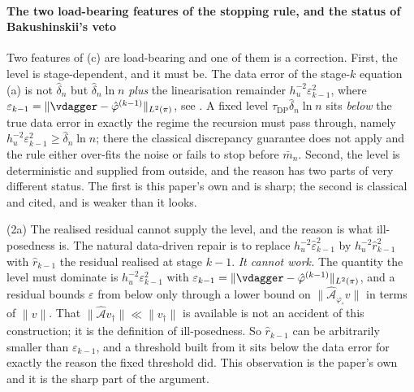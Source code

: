 \paragraph{The two load-bearing features of the stopping rule, and the status of Bakushinskii's veto}

Two features of (c) are load-bearing and one of them is a correction. First, the level is
stage-dependent, and it must be. The data error of the stage-$k$ equation (a) is not $\hat\delta_n$
but $\hat\delta_n\ln n$ \emph{plus} the linearisation remainder $h_u^{-2}\varepsilon_{k-1}^{2}$, where
$\varepsilon_{k-1}=\|\vdagger-\hat\varphi^{(k-1)}\|_{L^{2}(\pi)}$, see . A
fixed level $\tau_{\mathrm{DP}}\hat\delta_n\ln n$ sits
\emph{below} the true data error in exactly the regime the recursion must pass through, namely
$h_u^{-2}\varepsilon_{k-1}^{2}\ge\hat\delta_n\ln n$; there the classical discrepancy guarantee does not
apply and the rule either over-fits the noise or fails to stop before $\bar m_n$.
Second, the level is deterministic and supplied from outside, and the reason has two parts of
very different status. The first is this paper's own and is sharp; the second is classical and cited,
and is weaker than it looks.

(2a) The realised residual cannot supply the level, and the reason is what ill-posedness is. The
natural data-driven repair is to replace $h_u^{-2}\hat\varepsilon_{k-1}^{2}$ by
$h_u^{-2}\hat r_{k-1}^{2}$ with $\hat r_{k-1}$ the residual realised at stage $k-1$. \emph{It cannot
work.} The quantity the level must dominate is $h_u^{-2}\varepsilon_{k-1}^{2}$ with
$\varepsilon_{k-1}=\|\vdagger-\hat\varphi^{(k-1)}\|_{L^{2}(\pi)}$, and a residual bounds $\varepsilon$
from below only through a lower bound on $\|\hat{\mathcal A}_{\varphi_\circ}v\|$ in terms of $\|v\|$.
That $\|\hat{\mathcal A}v_\dagger\|\ll\|v_\dagger\|$ is available is not an accident of this
construction; it is the definition of ill-posedness. So $\hat r_{k-1}$ can be arbitrarily smaller than
$\varepsilon_{k-1}$, and a threshold built from it sits below the data error for exactly the reason the
fixed threshold did. This observation is the paper's own and it is the sharp part of the
argument.

